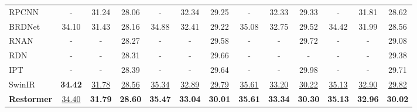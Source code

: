 \documentclass[10pt,twocolumn,letterpaper]{article}
\def\xnet{Restormer\xspace}
\begin{document}
\begin{table*}[t]
{{\begin{tabular}{l | c c c | c c c | c c c | c c c}
\midrule[0.1em]
\midrule[0.1em]
RPCNN~\cite{xia2020rpcnn}  &- & 31.24 & 28.06 & - & 32.34 & 29.25 & - & 32.33 & 29.33 & - & 31.81 & 28.62\\
BRDNet~\cite{tian2020BRDnet}  &34.10 & 31.43 & 28.16 & 34.88 & 32.41 & 29.22 & 35.08 & 32.75 & 29.52 & 34.42 & 31.99 & 28.56 \\
RNAN~\cite{zhang2019residual}  &-&-&28.27&-&-&29.58&-&-&29.72&-&-&29.08\\
RDN~\cite{zhang2020rdn}  &-&-&28.31&-&-&29.66&-&-&-&-&-&29.38\\
IPT~\cite{chen2021IPT}  &-&-&28.39&-&-&29.64&-&-&29.98&-&-&29.71\\
SwinIR~\cite{liang2021swinir} & \textbf{34.42} & \underline{31.78} & \underline{28.56} & \underline{35.34} & \underline{32.89} & \underline{29.79} & \underline{35.61} & \underline{33.20} & \underline{30.22} & \underline{35.13} & \underline{32.90} & \underline{29.82} \\
\textbf{\xnet} & \underline{34.40} & \textbf{31.79}& \textbf{28.60}& \textbf{35.47} & \textbf{33.04}& \textbf{30.01}& \textbf{35.61}& \textbf{33.34}& \textbf{30.30} & \textbf{35.13}& \textbf{32.96}& \textbf{30.02}\\ 
\bottomrule[0.1em]
\end{tabular}}
}
\vspace*{-1mm}
\end{table*}
 
\end{document}

